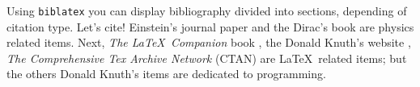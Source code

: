 Using \texttt{biblatex} you can display bibliography divided into sections, 
depending of citation type. 
Let's cite! Einstein's journal paper \cite{einstein} and the Dirac's 
book \cite{dirac} are physics related items. 
Next, \textit{The \LaTeX\ Companion} book , the Donald 
Knuth's website \cite{knuthwebsite}, \textit{The Comprehensive Tex Archive 
Network} (CTAN) are \LaTeX\ related items; but the others Donald 
Knuth's items \cite{knuth-fa} are dedicated to programming.